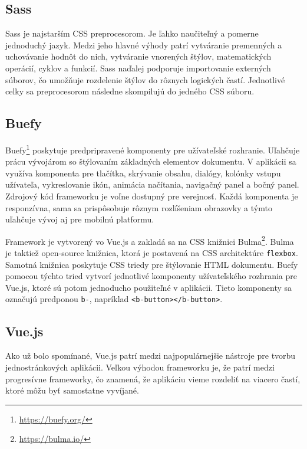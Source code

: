 \subsection*{Sass}
\label{sass}
Sass\cite{sass} je najstarším CSS preprocesorom. Je ľahko naučiteľný a pomerne jednoduchý jazyk. Medzi jeho hlavné výhody patrí vytváranie premenných a uchovávanie hodnôt do nich, vytváranie vnorených štýlov, matematických operácií, cyklov a funkcií. Sass naďalej podporuje importovanie externých súborov, čo umožňuje rozdelenie štýlov do rôznych logických častí. Jednotlivé celky sa preprocesorom následne skompilujú do jedného CSS súboru. 

\subsection*{Buefy}
\label{buefy}
Buefy\footnote{\url{https://buefy.org/}} poskytuje predpripravené komponenty pre užívateľské rozhranie. Uľahčuje prácu vývojárom so štýlovaním základných elementov dokumentu. V aplikácii sa využíva komponenta pre tlačítka, skrývanie obsahu, dialógy, kolónky vstupu užívateľa, vykreslovanie ikón, animácia načítania, navigačný panel a bočný panel. Zdrojový kód frameworku je voľne dostupný pre verejnosť. Každá komponenta je responzívna, sama sa prispôsobuje rôznym rozlíšeniam obrazovky a týmto uľahčuje vývoj aj pre mobilnú platformu. 

Framework je vytvorený vo Vue.js a zakladá sa na CSS knižnici Bulma\footnote{\url{https://bulma.io/}}. Bulma je taktiež open-source knižnica, ktorá je postavená na CSS architektúre \texttt{flexbox}. Samotná knižnica poskytuje CSS triedy pre štýlovanie HTML dokumentu. Buefy pomocou týchto tried vytvorí jednotlivé komponenty užívateľského rozhrania pre Vue.js, ktoré sú potom jednoducho použiteľné v aplikácii. Tieto komponenty sa označujú predponou \texttt{b-}, napríklad \texttt{<b-button></b-button>}.

\subsection{Vue.js}
\label{vue}
Ako už bolo spomínané, Vue.js\cite{vue-guide} patrí medzi najpopulárnejšie nástroje pre tvorbu jednostránkových aplikácii. Veľkou výhodou frameworku je, že patrí medzi progresívne frameworky, čo znamená, že aplikáciu vieme rozdeliť na viacero častí, ktoré môžu byť samostatne vyvíjané.

